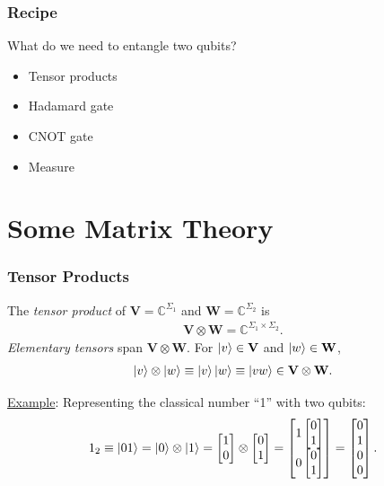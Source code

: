 \documentclass{beamer}
\theoremstyle{definition}
\newcommand{\V}{\mathbf{V}}
\newcommand{\W}{\mathbf{W}}
\begin{document}
\begin{frame}
\frametitle{Recipe}

What do we need to entangle two qubits?
\begin{itemize}
	\item Tensor products
	\item Hadamard gate
	\item CNOT gate
	\item Measure
\end{itemize}
\end{frame}








\section{Some Matrix Theory}

\begin{frame}
\frametitle{Tensor Products}
The \textit{tensor product} of $\V = \mathbb{C}^{\Sigma_1}$ and $\W = \mathbb{C}^{\Sigma_2}$ is
\begin{align*}
\V \otimes \W = \mathbb{C}^{\Sigma_1 \times \Sigma_2}.
\end{align*}
\textit{Elementary tensors} span $\V\otimes \W$. For $\ket{v} \in \V$ and $\ket{w} \in \W$, 
\begin{align*}
\ket{v}\otimes \ket{w}\equiv \ket{v}\ket{w} \equiv \ket{vw}  \in \V \otimes \W.
\end{align*} 

\underline{Example}: Representing the classical number ``1'' with two qubits:
\begin{align*}
1_2 \equiv \left\vert{01}\right\rangle = \left\vert{0}\right\rangle \otimes \left\vert{1}\right\rangle = \begin{bmatrix}
1\\0
\end{bmatrix}\otimes 
\begin{bmatrix}
0\\1
\end{bmatrix}
=
\begin{bmatrix}
1\begin{bmatrix}
0\\1
\end{bmatrix}\\
0\begin{bmatrix}
0\\1
\end{bmatrix}
\end{bmatrix} = \begin{bmatrix}
0\\1\\0\\0
\end{bmatrix}.
\end{align*}


\end{frame}
\end{document}
